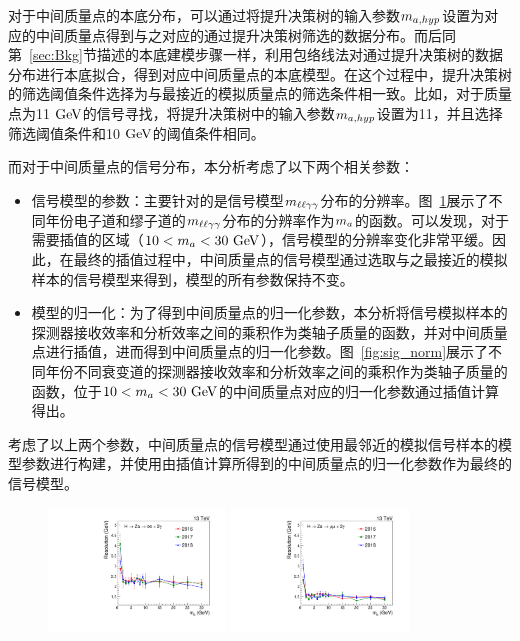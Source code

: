对于中间质量点的本底分布，可以通过将提升决策树的输入参数$m_{a,hyp}$设置为对应的中间质量点得到与之对应的通过提升决策树筛选的数据分布。而后同第~\ref{sec:Bkg}节描述的本底建模步骤一样，利用包络线法对通过提升决策树的数据分布进行本底拟合，得到对应中间质量点的本底模型。在这个过程中，提升决策树的筛选阈值条件选择为与最接近的模拟质量点的筛选条件相一致。比如，对于质量点为11$\GeV$的信号寻找，将提升决策树中的输入参数$m_{a,hyp}$设置为11，并且选择筛选阈值条件和10$\GeV$的阈值条件相同。

而对于中间质量点的信号分布，本分析考虑了以下两个相关参数：
\begin{itemize}
    \item 信号模型的参数：主要针对的是信号模型$m_{\ell\ell\gamma\gamma}$分布的分辨率。图~\ref{fig:sig_resolution}展示了不同年份电子道和缪子道的$m_{\ell\ell\gamma\gamma}$分布的分辨率作为$m_{a}$的函数。可以发现，对于需要插值的区域（$10<\ma<30\GeV$），信号模型的分辨率变化非常平缓。因此，在最终的插值过程中，中间质量点的信号模型通过选取与之最接近的模拟样本的信号模型来得到，模型的所有参数保持不变。
    \item 模型的归一化：为了得到中间质量点的归一化参数，本分析将信号模拟样本的探测器接收效率和分析效率之间的乘积作为类轴子质量的函数，并对中间质量点进行插值，进而得到中间质量点的归一化参数。图~\ref{fig:sig_norm}展示了不同年份不同衰变道的探测器接收效率和分析效率之间的乘积作为类轴子质量的函数，位于$10<\ma<30\GeV$的中间质量点对应的归一化参数通过插值计算得出。
\end{itemize}
考虑了以上两个参数，中间质量点的信号模型通过使用最邻近的模拟信号样本的模型参数进行构建，并使用由插值计算所得到的中间质量点的归一化参数作为最终的信号模型。

\begin{figure}[htbp]
  \begin{center}
		\includegraphics[width=0.42\textwidth]{figures/chapter04/resolution_ele.pdf}
        \includegraphics[width=0.42\textwidth]{figures/chapter04/resolution_mu.pdf} \\
    \label{fig:sig_resolution}
\end{center}
\end{figure}

